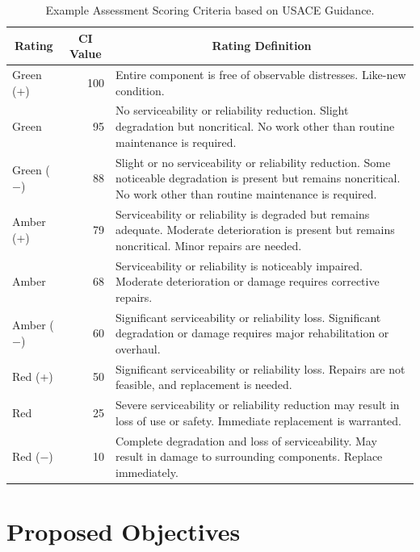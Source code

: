 \documentclass[Journal,letterpaper,NoPageNumbers,NoLineNumbers]{ascelike-new}
\begin{document}
\begin{table}
\caption{Example Assessment Scoring Criteria based on USACE Guidance.}
\label{table:AssessmentScores}
\centering
\small
\renewcommand{\arraystretch}{1.25}
\begin{tabular}{l r p{3.5in}}
\hline\hline
\multicolumn{1}{c}{Rating} &
\multicolumn{1}{c}{CI Value} &
\multicolumn{1}{c}{Rating Definition} \\
\hline
Green (+) &
100 &
Entire component is free of observable distresses. Like-new condition. \\

Green &
95 &
No serviceability or reliability reduction. Slight degradation but noncritical. No work other than routine maintenance is required. \\

Green ($-$) &
88 &
Slight or no serviceability or reliability reduction. Some noticeable degradation is present but remains noncritical. No work other than routine maintenance is required. \\

Amber (+) &
79 &
Serviceability or reliability is degraded but remains adequate. Moderate deterioration is present but remains noncritical. Minor repairs are needed. \\

Amber &
68 &
Serviceability or reliability is noticeably impaired. Moderate deterioration or damage requires corrective repairs. \\

Amber ($-$) &
60 &
Significant serviceability or reliability loss. Significant degradation or damage requires major rehabilitation or overhaul. \\

Red (+) &
50 &
Significant serviceability or reliability loss. Repairs are not feasible, and replacement is needed. \\

Red &
25 &
Severe serviceability or reliability reduction may result in loss of use or safety. Immediate replacement is warranted. \\

Red ($-$) &
10 &
Complete degradation and loss of serviceability. May result in damage to surrounding components. Replace immediately. \\
\hline\hline
\end{tabular}
\normalsize
\end{table}

\section{Proposed Objectives}
\end{document}
